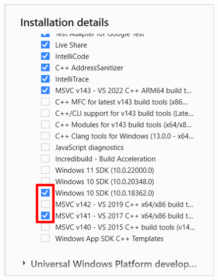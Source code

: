 {\begin{spacing}{1.5}
\begin{figure}[H]
            \includegraphics[scale=0.7]{Images/3/3.Intro.3.2}
            \\[25pt]

\end{figure}
\end{spacing}}
